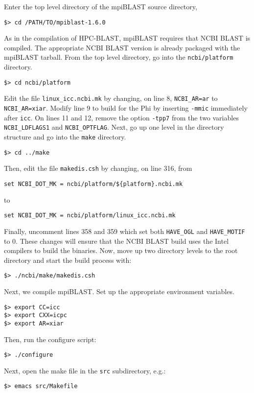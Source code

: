 \documentclass[10pt]{article}
\begin{document}
\noindent Enter the top level directory of the mpiBLAST source directory,
\begin{verbatim}
$> cd /PATH/TO/mpiblast-1.6.0
\end{verbatim}
\noindent As in the compilation of HPC-BLAST, mpiBLAST requires that NCBI BLAST is compiled.  The appropriate NCBI BLAST version is already packaged with the mpiBLAST tarball.
From the top level directory, go into the \verb^ncbi/platform^ directory.
\begin{verbatim}
$> cd ncbi/platform
\end{verbatim}
\noindent Edit the file \verb^linux_icc.ncbi.mk^ by changing, on line 8, \verb^NCBI_AR=ar^ to \verb^NCBI_AR=xiar^.  Modify line 9 to build
for the Phi by inserting \verb^-mmic^ immediately after \verb^icc^.  On lines 11 and 12, remove the option \verb^-tpp7^ from the two variables
\verb^NCBI_LDFLAGS1^ and \verb^NCBI_OPTFLAG^.  Next, go up one level in the directory structure and go into the \verb^make^ directory.
\begin{verbatim}
$> cd ../make
\end{verbatim}
\noindent Then, edit the file \verb^makedis.csh^ by changing, on line 316, from
\begin{verbatim}
set NCBI_DOT_MK = ncbi/platform/${platform}.ncbi.mk
\end{verbatim}
\noindent to
\begin{verbatim}
set NCBI_DOT_MK = ncbi/platform/linux_icc.ncbi.mk
\end{verbatim}
\noindent Finally, uncomment lines 358 and 359 which set both \verb^HAVE_OGL^ and \verb^HAVE_MOTIF^ to 0.
These changes will ensure that the NCBI BLAST build uses the Intel compilers to build the binaries.  Now, move up two directory levels to the root directory and start the build process with:
\begin{verbatim}
$> ./ncbi/make/makedis.csh
\end{verbatim}
\noindent Next, we compile mpiBLAST.  Set up the appropriate environment variables.
\begin{verbatim}
$> export CC=icc
$> export CXX=icpc
$> export AR=xiar
\end{verbatim}
\noindent Then, run the configure script:
\begin{verbatim}
$> ./configure
\end{verbatim}
\noindent Next, open the make file in the \verb^src^ subdirectory, e.g.:
\begin{verbatim}
$> emacs src/Makefile
\end{verbatim}
\end{document}
